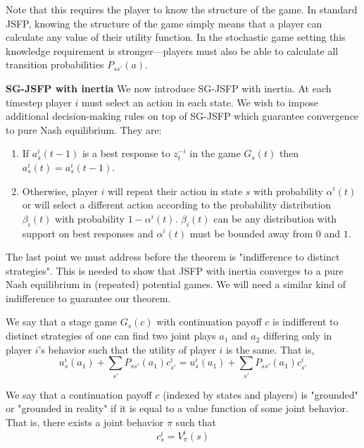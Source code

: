 Note that this requires the player to know the structure of the game. In standard JSFP, knowing the structure of the game simply means that a player can calculate any value of their utility function. In the stochastic game setting this knowledge requirement is stronger---players must also be able to calculate all transition probabilities $P_{ss'}(a)$. 



{\bf SG-JSFP with inertia} We now introduce SG-JSFP with inertia. At each timestep player $i$ must select an action in each state. We wish to impose additional decision-making rules on top of SG-JSFP which guarantee convergence to pure Nash equilibrium. They are:

\begin{enumerate}
\item If $a_s^i(t-1)$ is a best response to $z^{-i}_t$ in the game $G_s(t)$ then $a^i_s(t) = a^i_s(t-1)$.
\item Otherwise, player $i$ will repeat their action in state $s$ with probability $\alpha^i(t)$ or will select a different action according to the probability distribution $\beta_i(t)$ with probability $1 - \alpha^i(t)$. $\beta_i(t)$ can be any distribution with support on best responses and $\alpha^i(t)$ must be bounded away from $0$ and $1$.
\end{enumerate}

The last point we must address before the theorem is "indifference to distinct strategies". This is needed to show that JSFP with inertia converges to a pure Nash equilibrium in (repeated) potential games. We will need a similar kind of indifference to guarantee our theorem. 

\begin{mydef}
We say that a stage game $G_s(c)$ with continuation payoff $c$ is indifferent to distinct strategies of one can find two joint plays $a_1$ and $a_2$ differing only in player $i$'s behavior such that the utility of player $i$ is the same. That is,
$$
u^i_s(a_1) + \sum_{s'} P_{ss'}(a_1)c^i_{s'} = u^i_s(a_1) + \sum_{s'} P_{ss'}(a_1)c^i_{s'}
$$
\end{mydef}

\begin{mydef}
We say that a continuation payoff $c$ (indexed by states and players) is "grounded" or "grounded in reality" if it is equal to a value function of some joint behavior. That is, there exists a joint behavior $\pi$ such that
$$
c^i_s = V^i_{\pi}(s)
$$
\end{mydef}

